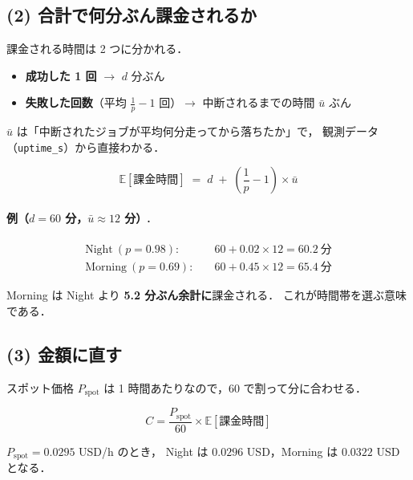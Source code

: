 \documentclass[11pt,a4paper]{ltjsarticle}
\newcommand{\Pspot}{P_{\mathrm{spot}}}
\newcommand{\E}{\mathbb{E}}
\begin{document}
\subsection{(2) 合計で何分ぶん課金されるか}

課金される時間は 2 つに分かれる．

\begin{itemize}
  \item \textbf{成功した 1 回} $\to$ $d$ 分ぶん
  \item \textbf{失敗した回数}（平均 $\frac{1}{p}-1$ 回）$\to$
        中断されるまでの時間 $\bar u$ ぶん
\end{itemize}

$\bar u$ は「中断されたジョブが平均何分走ってから落ちたか」で，
観測データ（\texttt{uptime\_s}）から直接わかる．

\begin{equation}
\E[\text{課金時間}] \;=\; d \;+\; \left(\frac{1}{p}-1\right) \times \bar u
\label{eq:billed}
\end{equation}

\paragraph{例（$d = 60$ 分，$\bar u \approx 12$ 分）.}

\begin{align}
\text{Night}\ (p = 0.98):\quad   & 60 + 0.02 \times 12 = 60.2\ \text{分} \\
\text{Morning}\ (p = 0.69):\quad & 60 + 0.45 \times 12 = 65.4\ \text{分}
\end{align}

Morning は Night より \textbf{5.2 分ぶん余計に}課金される．
これが時間帯を選ぶ意味である．

\subsection{(3) 金額に直す}

スポット価格 $\Pspot$ は 1 時間あたりなので，$60$ で割って分に合わせる．

\begin{equation}
C = \frac{\Pspot}{60} \times \E[\text{課金時間}]
\end{equation}

$\Pspot = 0.0295$ USD/h のとき，
Night は $0.0296$ USD，Morning は $0.0322$ USD となる．
\end{document}
